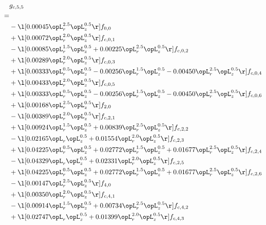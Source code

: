\begin{alignat}{2} 
\label{eq:g_55_0} 
& g_{c,5,5} \nonumber \\ 
 = \\ 
& - \l[  0.00045 \opL_r^{2.5} \opL_z^{0.5}  \r] f_{0,0} \nonumber \\ 
& + \l[  0.00072 \opL_r^{2.0} \opL_z^{0.5}  \r] f_{c,0,1} \nonumber \\ 
& - \l[  0.00085 \opL_r^{1.5} \opL_z^{0.5} +  0.00225 \opL_r^{2.5} \opL_z^{0.5}  \r] f_{c,0,2} \nonumber \\ 
& + \l[  0.00289 \opL_r^{2.0} \opL_z^{0.5}  \r] f_{c,0,3} \nonumber \\ 
& + \l[  0.00333 \opL_r^{0.5} \opL_z^{0.5}   -0.00256 \opL_r^{1.5} \opL_z^{0.5}   -0.00450 \opL_r^{2.5} \opL_z^{0.5}  \r] f_{c,0,4} \nonumber \\ 
& + \l[  0.00433 \opL_r^{2.0} \opL_z^{0.5}  \r] f_{c,0,5} \nonumber \\ 
& + \l[  0.00333 \opL_r^{0.5} \opL_z^{0.5}   -0.00256 \opL_r^{1.5} \opL_z^{0.5}   -0.00450 \opL_r^{2.5} \opL_z^{0.5}  \r] f_{c,0,6} \nonumber \\ 
& + \l[  0.00168 \opL_r^{2.5} \opL_z^{0.5}  \r] f_{2,0} \nonumber \\ 
& - \l[  0.00389 \opL_r^{2.0} \opL_z^{0.5}  \r] f_{c,2,1} \nonumber \\ 
& + \l[  0.00924 \opL_r^{1.5} \opL_z^{0.5} +  0.00839 \opL_r^{2.5} \opL_z^{0.5}  \r] f_{c,2,2} \nonumber \\ 
& - \l[  0.02165 \opL_r \opL_z^{0.5} +  0.01554 \opL_r^{2.0} \opL_z^{0.5}  \r] f_{c,2,3} \nonumber \\ 
& + \l[  0.04225 \opL_r^{0.5} \opL_z^{0.5} +  0.02772 \opL_r^{1.5} \opL_z^{0.5} +  0.01677 \opL_r^{2.5} \opL_z^{0.5}  \r] f_{c,2,4} \nonumber \\ 
& - \l[  0.04329 \opL_r \opL_z^{0.5} +  0.02331 \opL_r^{2.0} \opL_z^{0.5}  \r] f_{c,2,5} \nonumber \\ 
& + \l[  0.04225 \opL_r^{0.5} \opL_z^{0.5} +  0.02772 \opL_r^{1.5} \opL_z^{0.5} +  0.01677 \opL_r^{2.5} \opL_z^{0.5}  \r] f_{c,2,6} \nonumber \\ 
& - \l[  0.00147 \opL_r^{2.5} \opL_z^{0.5}  \r] f_{4,0} \nonumber \\ 
& + \l[  0.00350 \opL_r^{2.0} \opL_z^{0.5}  \r] f_{c,4,1} \nonumber \\ 
& - \l[  0.00914 \opL_r^{1.5} \opL_z^{0.5} +  0.00734 \opL_r^{2.5} \opL_z^{0.5}  \r] f_{c,4,2} \nonumber \\ 
& + \l[  0.02747 \opL_r \opL_z^{0.5} +  0.01399 \opL_r^{2.0} \opL_z^{0.5}  \r] f_{c,4,3} \nonumber \\ 

\end{alignat}
